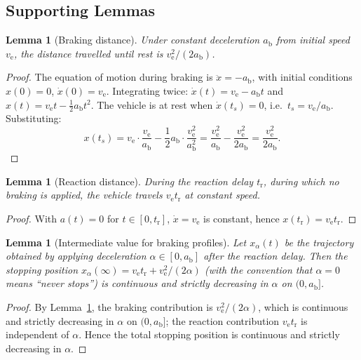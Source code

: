 \documentclass[conference, a4paper]{IEEEtran}
\theoremstyle{plain}
\newtheorem{lemma}[theorem]{Lemma}
\newcommand{\ab}{a_{\mathrm{b}}}
\newcommand{\tr}{t_{\mathrm{r}}}
\newcommand{\ve}{v_{\mathrm{e}}}
\begin{document}
\subsection{Supporting Lemmas}

\begin{lemma}[Braking distance]
\label{lem:brakedist}
Under constant deceleration $\ab$ from initial speed $\ve$, the distance
travelled until rest is $\ve^2 / (2\ab)$.
\end{lemma}

\begin{proof}
The equation of motion during braking is $\ddot{x} = -\ab$, with initial
conditions $x(0)=0$, $\dot{x}(0)=\ve$. Integrating twice:
$\dot{x}(t) = \ve - \ab t$ and
$x(t) = \ve t - \tfrac{1}{2}\ab t^2$. The vehicle is at rest when
$\dot{x}(t_s) = 0$, i.e.\ $t_s = \ve/\ab$. Substituting:
\[
x(t_s) = \ve \cdot \frac{\ve}{\ab} - \frac{1}{2}\ab \cdot
\frac{\ve^2}{\ab^2}
= \frac{\ve^2}{\ab} - \frac{\ve^2}{2\ab}
= \frac{\ve^2}{2\ab}.
\]
\end{proof}

\begin{lemma}[Reaction distance]
\label{lem:reactdist}
During the reaction delay $\tr$, during which no braking is applied, the
vehicle travels $\ve \tr$ at constant speed.
\end{lemma}

\begin{proof}
With $a(t) = 0$ for $t \in [0, \tr]$, $\dot{x} = \ve$ is constant, hence
$x(\tr) = \ve \tr$.
\end{proof}

\begin{lemma}[Intermediate value for braking profiles]
\label{lem:ivt}
Let $x_\alpha(t)$ be the trajectory obtained by applying deceleration
$\alpha \in [0, \ab]$ after the reaction delay. Then the stopping position
$x_\alpha(\infty) = \ve \tr + \ve^2/(2\alpha)$ (with the convention that
$\alpha = 0$ means ``never stops'') is continuous and strictly decreasing in
$\alpha$ on $(0, \ab]$.
\end{lemma}

\begin{proof}
By Lemma~\ref{lem:brakedist}, the braking contribution is $\ve^2/(2\alpha)$,
which is continuous and strictly decreasing in $\alpha$ on $(0, \ab]$;
the reaction contribution $\ve \tr$ is independent of $\alpha$. Hence the
total stopping position is continuous and strictly decreasing in $\alpha$.
\end{proof}
\end{document}
